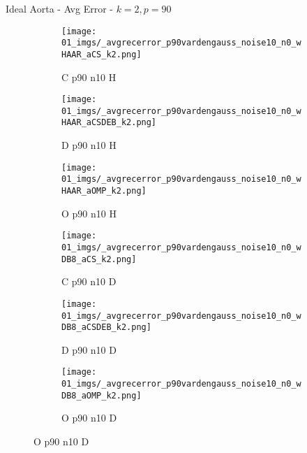 \begin{frame}{Ideal Aorta - Avg Error - $k=2,p=90$}{}
\begin{figure}
\begin{subfigure}{0.13\textwidth}
\texttt{[image: 01\_imgs/\_avgrecerror\_p90vardengauss\_noise10\_n0\_wHAAR\_aCS\_k2.png]}
\caption*{\tiny C p90 n10 H}
\end{subfigure}
\begin{subfigure}{0.13\textwidth}
\texttt{[image: 01\_imgs/\_avgrecerror\_p90vardengauss\_noise10\_n0\_wHAAR\_aCSDEB\_k2.png]}
\caption*{\tiny D p90 n10 H}
\end{subfigure}
\begin{subfigure}{0.13\textwidth}
\texttt{[image: 01\_imgs/\_avgrecerror\_p90vardengauss\_noise10\_n0\_wHAAR\_aOMP\_k2.png]}
\caption*{\tiny O p90 n10 H}
\end{subfigure}
\begin{subfigure}{0.13\textwidth}
\texttt{[image: 01\_imgs/\_avgrecerror\_p90vardengauss\_noise10\_n0\_wDB8\_aCS\_k2.png]}
\caption*{\tiny C p90 n10 D}
\end{subfigure}
\begin{subfigure}{0.13\textwidth}
\texttt{[image: 01\_imgs/\_avgrecerror\_p90vardengauss\_noise10\_n0\_wDB8\_aCSDEB\_k2.png]}
\caption*{\tiny D p90 n10 D}
\end{subfigure}
\begin{subfigure}{0.13\textwidth}
\texttt{[image: 01\_imgs/\_avgrecerror\_p90vardengauss\_noise10\_n0\_wDB8\_aOMP\_k2.png]}
\caption*{\tiny O p90 n10 D}
\end{subfigure}

\vspace{5pt}


\end{figure}
\end{frame}
